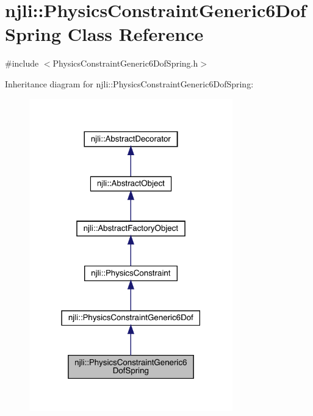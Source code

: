 \hypertarget{classnjli_1_1_physics_constraint_generic6_dof_spring}{}\section{njli\+:\+:Physics\+Constraint\+Generic6\+Dof\+Spring Class Reference}
\label{classnjli_1_1_physics_constraint_generic6_dof_spring}


{\ttfamily \#include $<$Physics\+Constraint\+Generic6\+Dof\+Spring.\+h$>$}



Inheritance diagram for njli\+:\+:Physics\+Constraint\+Generic6\+Dof\+Spring\+:\nopagebreak
\begin{figure}[H]
\begin{center}
\leavevmode
\includegraphics[width=250pt]{classnjli_1_1_physics_constraint_generic6_dof_spring__inherit__graph}
\end{center}
\end{figure}


